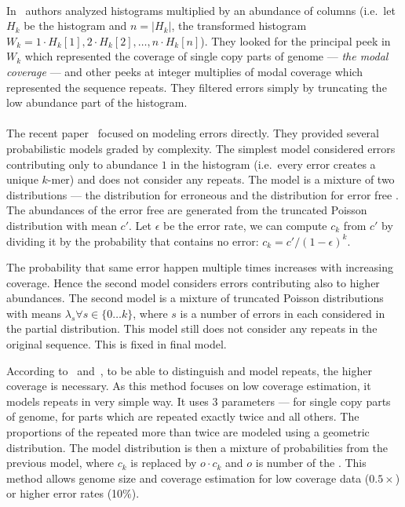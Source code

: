\paragraph{} In~\cite{williams} authors analyzed \kmer histograms multiplied by an abundance of columns (i.e.\ let $H_k$ be the \kmer histogram and $n = |H_k|$, the transformed histogram $W_k = 1 \cdot H_k[1], 2\cdot H_k[2], \dots, n \cdot H_k[n]$). They looked for the principal peek in $W_k$ which represented the coverage of single copy parts of genome --- \emph{the modal coverage} --- and other peeks at integer multiplies of modal coverage which represented the sequence repeats.
They filtered errors simply by truncating the low abundance part of the histogram.

\paragraph{} The recent paper~\cite{covest} focused on modeling errors directly. They provided several probabilistic models graded by complexity.
The simplest model considered errors contributing only to abundance $1$ in the histogram (i.e.\ every error creates a unique $k$-mer) and does not consider any repeats. The model is a mixture of two distributions --- the distribution for erroneous \kmers and the distribution for error free \kmers. The abundances of the error free \kmers are generated from the truncated Poisson distribution with mean $c'$. Let $\epsilon$ be the error rate, we can compute $c_k$ from $c'$ by dividing it by the probability that \kmer contains no error: $c_k = c'/{(1-\epsilon)}^k$.

The probability that same error happen multiple times increases with increasing coverage. Hence the second model considers errors contributing also to higher abundances.
The second model is a mixture of truncated Poisson distributions with means $\lambda_s \forall s \in \{0\dots k\}$, where $s$ is a number of errors in each \kmer considered in the partial distribution. This model still does not consider any repeats in the original sequence.
This is fixed in final model.

According to~\cite{waterman} and~\cite{williams}, to be able to distinguish and model repeats, the higher coverage is necessary. As this method focuses on low coverage estimation, it models repeats in very simple way. It uses 3 parameters --- for single copy parts of genome, for parts which are repeated exactly twice and all others. The proportions of the \kmers repeated more than twice are modeled using a geometric distribution. The model distribution is then a mixture of probabilities from the previous model, where $c_k$ is replaced by $o \cdot c_k$ and $o$ is number of the \kmer.
This method allows genome size and coverage estimation for low coverage data ($0.5\times$) or higher error rates (10\%).

